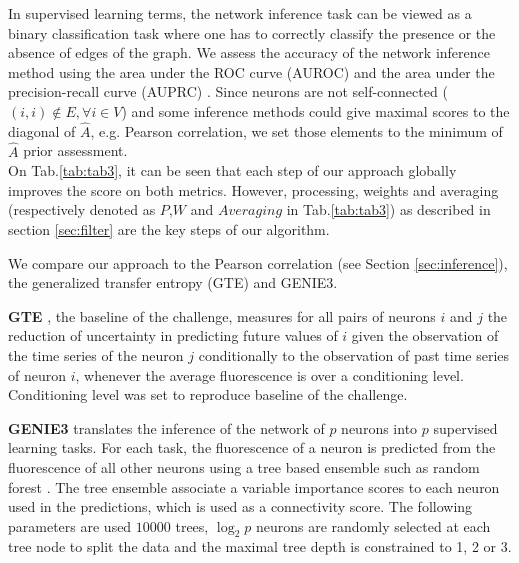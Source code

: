 \documentclass[wcp]{jmlr}
\begin{document}
In supervised learning terms, the network inference task can be viewed as a
binary classification task where one has to correctly classify the presence
or the absence of edges of the graph. We assess the accuracy of the
network inference method using the area under the ROC curve (AUROC)
and the area under the precision-recall curve (AUPRC)
\citep{schrynemackers2013protocols}. Since neurons are not self-connected
($(i, i) \not \in E, \forall i \in V$) and some inference methods could
give maximal scores to the diagonal of $\hat{A}$, e.g. Pearson
correlation, we set those elements to the minimum of $\hat{A}$ prior
assessment.\\


On Tab.\ref{tab:tab3}, it can be seen that each step of our approach globally
improves the score on both metrics. However, processing, weights and averaging
(respectively denoted as $P$,$W$ and $Averaging$ in Tab.\ref{tab:tab3}) as
described in section \ref{sec:filter} are the key steps of our algorithm.


We compare our approach to the Pearson correlation (see Section
\ref{sec:inference}), the generalized transfer entropy (GTE) and GENIE3.

\textbf{GTE} \citep{stetter2012model}
, the baseline of the challenge, measures for all pairs of
neurons $i$ and $j$ the reduction of uncertainty in predicting future values of
$i$ given the observation of the time series of the neuron $j$
conditionally to the observation of past time series of neuron $i$,
whenever the average fluorescence is over a conditioning level.
Conditioning level was set to reproduce baseline of the challenge.

\textbf{GENIE3} \citep{huynhthu2010inferring} translates the inference of the
network of $p$ neurons into $p$ supervised learning tasks. For each task,
the fluorescence of a neuron is predicted from the fluorescence
of all other neurons using a tree based ensemble such as
random forest \citep{breiman2001random}. The tree ensemble associate a
variable importance scores \citep{louppe2013understanding}
to each neuron used in the predictions, which is used as a connectivity
score. The following parameters are used
$10000$ trees, $\log_2{p}$ neurons are randomly selected at each tree
node to split the data and the maximal tree depth is constrained
to 1, 2 or 3.\\



\end{document}
